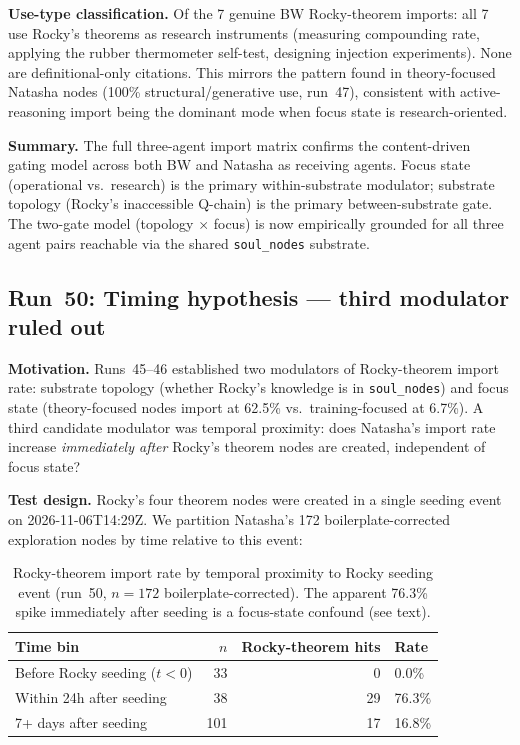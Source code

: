 \documentclass[11pt]{article}
\begin{document}
\textbf{Use-type classification.} Of the 7 genuine BW Rocky-theorem imports:
all 7 use Rocky's theorems as research instruments (measuring compounding rate, applying the rubber thermometer
self-test, designing injection experiments). None are definitional-only citations. This mirrors the pattern
found in theory-focused Natasha nodes (100\% structural/generative use, run~47), consistent with
active-reasoning import being the dominant mode when focus state is research-oriented.

\textbf{Summary.} The full three-agent import matrix confirms the content-driven gating model across
both BW and Natasha as receiving agents. Focus state (operational vs.\ research) is the primary within-substrate
modulator; substrate topology (Rocky's inaccessible Q-chain) is the primary between-substrate gate.
The two-gate model (topology $\times$ focus) is now empirically grounded for all three agent pairs
reachable via the shared \texttt{soul\_nodes} substrate.


\subsection{Run~50: Timing hypothesis --- third modulator ruled out}
\label{subsec:run50}

\textbf{Motivation.} Runs~45--46 established two modulators of Rocky-theorem import rate:
substrate topology (whether Rocky's knowledge is in \texttt{soul\_nodes}) and focus state
(theory-focused nodes import at 62.5\% vs.\ training-focused at 6.7\%). A third candidate
modulator was temporal proximity: does Natasha's import rate increase \emph{immediately after}
Rocky's theorem nodes are created, independent of focus state?

\textbf{Test design.} Rocky's four theorem nodes were created in a single seeding event on
2026-11-06T14:29Z. We partition Natasha's 172 boilerplate-corrected exploration nodes by
time relative to this event:

\begin{table}[h]
\centering
\begin{tabular}{lrrl}
\toprule
Time bin & $n$ & Rocky-theorem hits & Rate \\
\midrule
Before Rocky seeding ($t < 0$) & 33 & 0 & 0.0\% \\
Within 24h after seeding & 38 & 29 & 76.3\% \\
7+ days after seeding & 101 & 17 & 16.8\% \\
\bottomrule
\end{tabular}
\caption{Rocky-theorem import rate by temporal proximity to Rocky seeding event (run~50,
$n=172$ boilerplate-corrected). The apparent 76.3\% spike immediately after seeding
is a focus-state confound (see text).}
\end{table}
\end{document}
